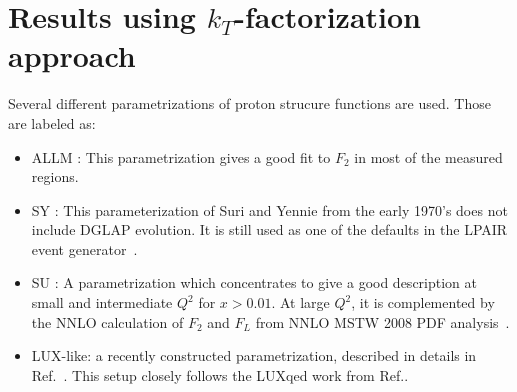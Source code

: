\section{Results using $k_T$-factorization approach}


Several different parametrizations of proton strucure functions are used. Those are labeled as:
\begin{itemize} 

 \item ALLM \cite{Abramowicz:1991xz,Abramowicz:1997ms}: This parametrization gives a good fit to $F_2$ in most of the measured regions.
   
  
\item SY \cite{Suri:1971yx}: This parameterization of Suri and Yennie from the early 1970's does not include DGLAP evolution. It is still  used as one of the defaults in the LPAIR event generator~\cite{Vermaseren:1982cz}.
    
\item SU \cite{Szczurek:1999rd}: A parametrization which concentrates to give a good description at small and intermediate $Q^2$ for $x > 0.01$.
At large $Q^2$, it is complemented by the NNLO calculation of $F_2$ and $F_L$ from NNLO MSTW 2008 PDF analysis~\cite{Martin:2009iq}.
   
\item LUX-like: a recently constructed parametrization, described in details in Ref.~\cite{Luszczak:2018ntp}.
This setup closely follows the LUXqed work from Ref.\cite{Manohar:2017eqh}.
\end{itemize} 

